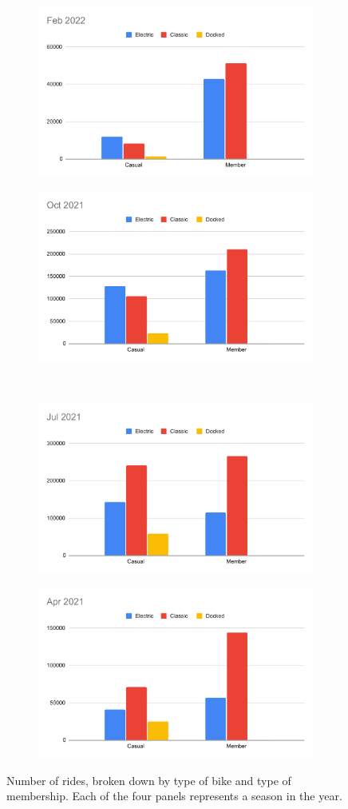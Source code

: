 \documentclass[11pt,twoside]{article}
\theoremstyle{plain}
\theoremstyle{definition}
\theoremstyle{remark}
\begin{document}
\begin{center}
\begin{figure}
\begin{subfigure}{}
  \includegraphics[width=.5\linewidth]{Feb2022RideBreakdown}
\end{subfigure}%
\begin{subfigure}{}
  \includegraphics[width=.5\linewidth]{Oct2021RideBreakdown}
\end{subfigure}\\
\begin{subfigure}{}
  \includegraphics[width=.5\linewidth]{Jul2021RideBreakdown}
\end{subfigure}
\begin{subfigure}{}
  \includegraphics[width=.5\linewidth]{Apr2021RideBreakdown}
\end{subfigure}
\caption{Number of rides, broken down by type of bike and type of membership. Each of the four panels represents a season in the year.}
\label{fig:RideBreakdown}
\end{figure}
\end{center}
\end{document}
